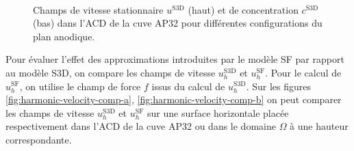 \begin{figure}[h]
\begin{center}
    \begin{multicols}{2}
        \\
    \end{multicols}

    \caption{Champs de vitesse stationnaire $u^{\mathrm{S3D}}$ (haut) et de
      concentration $c^\mathrm{S3D}$ (bas) dans l'ACD de la cuve
      AP32 pour différentes configurations du plan anodique.}
    \label{fig:f3d-deactivated-b}
  \end{center}
\end{figure}

Pour évaluer l'effet des approximations introduites par le modèle
SF par rapport au modèle S3D, on compare les champs de vitesse
$u_h^{\mathrm{S3D}}$ et $u_h^{\mathrm{SF}}$. Pour le calcul de
$u_h^{\mathrm{SF}}$, on utilise le champ de force $f$ issus du calcul de
$u_h^{\mathrm{S3D}}$. Sur les figures \ref{fig:harmonic-velocity-comp-a}, \ref{fig:harmonic-velocity-comp-b}
on peut comparer les champs de vitesse $u_h^{\mathrm{S3D}}$ et
$u_h^\mathrm{SF}$ sur une surface horizontale placée respectivement
dans l'ACD de la cuve AP32 ou dans le domaine $\Omega$ à une hauteur
correspondante.

